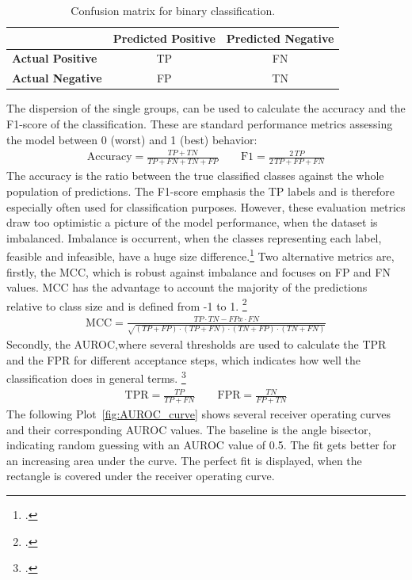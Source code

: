 \begin{table}[ht]
    \centering
    \small
    \begin{tabular}{@{}lcc@{}}
        \toprule
                                 & \textbf{Predicted Positive} & \textbf{Predicted Negative} \\
        \midrule
        \textbf{Actual Positive} & \Gls{TP}                    & \Gls{FN}                    \\
        \textbf{Actual Negative} & \Gls{FP}                    & \Gls{TN}                    \\
        \bottomrule
    \end{tabular}
    \caption{Confusion matrix for binary classification.}
    \label{tab:confusion_matrix}
\end{table}

The dispersion of the single groups, can be used to calculate the accuracy and the F1-score of the classification.
These are standard performance metrics assessing the model between 0 (worst) and 1 (best) behavior:
\begin{align}
    \text{Accuracy}=\frac{TP+TN}{TP+FN+TN+FP}
    \qquad
    \text{F1}=\frac{2\,TP}{2\,TP+FP+FN}
\end{align}
The accuracy is the ratio between the true classified classes against the whole population
of predictions. The F1-score emphasis the \gls{TP} labels and is therefore especially
often used for classification purposes.
However, these evaluation metrics draw too optimistic a picture of the model performance,
when the dataset is imbalanced. Imbalance is occurrent,
when the classes representing each label, feasible and infeasible, have a huge size difference.\footcite[cf.][p. 2f]{chicco_advantages_2020}
Two alternative metrics are, firstly, the \gls{MCC}, which is robust against imbalance
and focuses on \gls{FP} and \gls{FN} values. \gls{MCC} has the advantage to account the majority of the predictions
relative to class size and is defined from -1 to 1. \footcite[cf.][p. 5]{chicco_advantages_2020}
\begin{align}
    \text{MCC}=\frac{TP \cdot TN - FP x\cdot FN}{\sqrt{(TP+FP)\cdot(TP+FN)\cdot(TN+FP)\cdot(TN+FN)}}
\end{align}
Secondly, the \gls{AUROC},where several thresholds are used
to calculate the \gls{TPR} and the \gls{FPR} for different acceptance steps,
which indicates how well the classification does in general terms. \footcite[cf.][p. 2f]{chicco_advantages_2020}
\begin{align}
    \text{TPR}=\frac{TP}{TP+FN}
    \qquad
    \text{FPR}=\frac{TN}{FP+TN}
\end{align}
The following Plot~\ref{fig:AUROC_curve} shows several receiver operating curves and their corresponding \gls{AUROC} values.
The baseline is the angle bisector, indicating random guessing with an \gls{AUROC} value of 0.5. The fit gets better
for an increasing area under the curve. The perfect fit is displayed, when the rectangle is covered under the receiver operating curve.

